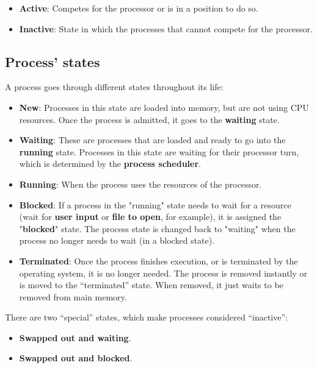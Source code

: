 \begin{itemize}
    \item \textbf{Active}: Competes for the processor or is in a position to do so.

    \item \textbf{Inactive}: State in which the processes that cannot compete for the processor.
\end{itemize}


\subsection{Process' states}
A process goes through different states throughout its life:

\begin{itemize}
    \item \textbf{New}: Processes in this state are loaded into memory, but are not using CPU resources. Once the process is admitted, it goes to the \textbf{waiting} state.

    \item \textbf{Waiting}: These are processes that are loaded and ready to go into the \textbf{running} state. Processes in this state are waiting for their processor turn, which is determined by the \textbf{process scheduler}.

    \item \textbf{Running}: When the process uses the resources of the processor.

    \item \textbf{Blocked}: If a process in the "running" state needs to wait for a resource (wait for \textbf{user input} or \textbf{file to open}, for example), it is assigned the "\textbf{blocked}" state. The process state is changed back to "waiting" when the process no longer needs to wait (in a blocked state).

    \item \textbf{Terminated}: Once the process finishes execution, or is terminated by the operating system, it is no longer needed. The process is removed instantly or is moved to the “terminated” state. When removed, it just waits to be removed from main memory.
\end{itemize}


There are two “special” states, which make processes considered “inactive”:

\begin{itemize}
    \item \textbf{Swapped out and waiting}.
    \item \textbf{Swapped out and blocked}.
\end{itemize}

